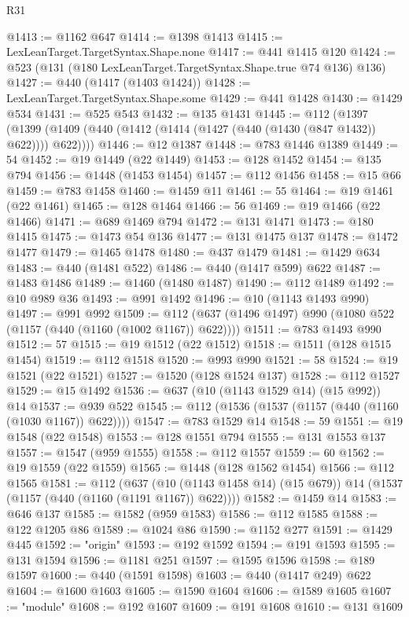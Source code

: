 \begin{lexlean}{R31}
\begin{coremodule}
@1413 := @1162 @647
@1414 := @1398 @1413
@1415 := LexLeanTarget.TargetSyntax.Shape.none
@1417 := @441 @1415 @120
@1424 := @523 (@131 (@180 LexLeanTarget.TargetSyntax.Shape.true @74 @136) @136)
@1427 := @440 (@1417 (@1403 @1424))
@1428 := LexLeanTarget.TargetSyntax.Shape.some
@1429 := @441 @1428
@1430 := @1429 @534
@1431 := @525 @543
@1432 := @135 @1431
@1445 := @112
    (@1397 (@1399 (@1409 (@440 (@1412 (@1414 (@1427 (@440 (@1430 (@847 @1432)) @622)))) @622))))
@1446 := @12 @1387
@1448 := @783 @1446 @1389
@1449 := 54
@1452 := @19 @1449 (@22 @1449)
@1453 := @128 @1452
@1454 := @135 @794
@1456 := @1448 (@1453 @1454)
@1457 := @112 @1456
@1458 := @15 @66
@1459 := @783 @1458
@1460 := @1459 @11
@1461 := 55
@1464 := @19 @1461 (@22 @1461)
@1465 := @128 @1464
@1466 := 56
@1469 := @19 @1466 (@22 @1466)
@1471 := @689 @1469 @794
@1472 := @131 @1471
@1473 := @180 @1415
@1475 := @1473 @54 @136
@1477 := @131 @1475 @137
@1478 := @1472 @1477
@1479 := @1465 @1478
@1480 := @437 @1479
@1481 := @1429 @634
@1483 := @440 (@1481 @522)
@1486 := @440 (@1417 @599) @622
@1487 := @1483 @1486
@1489 := @1460 (@1480 @1487)
@1490 := @112 @1489
@1492 := @10 @989 @36
@1493 := @991 @1492
@1496 := @10 (@1143 @1493 @990)
@1497 := @991 @992
@1509 := @112 (@637 (@1496 @1497) @990 (@1080 @522 (@1157 (@440 (@1160 (@1002 @1167)) @622))))
@1511 := @783 @1493 @990
@1512 := 57
@1515 := @19 @1512 (@22 @1512)
@1518 := @1511 (@128 @1515 @1454)
@1519 := @112 @1518
@1520 := @993 @990
@1521 := 58
@1524 := @19 @1521 (@22 @1521)
@1527 := @1520 (@128 @1524 @137)
@1528 := @112 @1527
@1529 := @15 @1492
@1536 := @637 (@10 (@1143 @1529 @14) (@15 @992)) @14
@1537 := @939 @522
@1545 := @112 (@1536 (@1537 (@1157 (@440 (@1160 (@1030 @1167)) @622))))
@1547 := @783 @1529 @14
@1548 := 59
@1551 := @19 @1548 (@22 @1548)
@1553 := @128 @1551 @794
@1555 := @131 @1553 @137
@1557 := @1547 (@959 @1555)
@1558 := @112 @1557
@1559 := 60
@1562 := @19 @1559 (@22 @1559)
@1565 := @1448 (@128 @1562 @1454)
@1566 := @112 @1565
@1581 := @112
    (@637 (@10 (@1143 @1458 @14) (@15 @679)) @14 (@1537 (@1157 (@440 (@1160 (@1191 @1167)) @622))))
@1582 := @1459 @14
@1583 := @646 @137
@1585 := @1582 (@959 @1583)
@1586 := @112 @1585
@1588 := @122 @1205 @86
@1589 := @1024 @86
@1590 := @1152 @277
@1591 := @1429 @445
@1592 := "origin"
@1593 := @192 @1592
@1594 := @191 @1593
@1595 := @131 @1594
@1596 := @1181 @251
@1597 := @1595 @1596
@1598 := @189 @1597
@1600 := @440 (@1591 @1598)
@1603 := @440 (@1417 @249) @622
@1604 := @1600 @1603
@1605 := @1590 @1604
@1606 := @1589 @1605
@1607 := "module"
@1608 := @192 @1607
@1609 := @191 @1608
@1610 := @131 @1609

\end{coremodule}
\end{lexlean}
